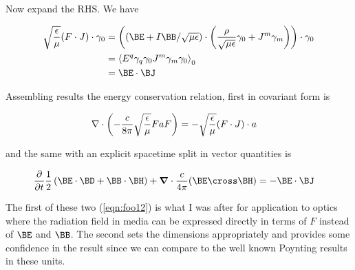 Now expand the RHS.  We have

\begin{align*}
\sqrt{\frac{\epsilon}{\mu}}
(F \cdot J) \cdot \gamma_0
&=
\left((\BE + I \BB/\sqrt{\mu\epsilon}) \cdot \left( \frac{\rho}{\sqrt{\mu\epsilon}} \gamma_0 + J^m \gamma_m \right) \right) \cdot \gamma_0  \\
&=
\gpgradezero{E^q \gamma_q \gamma_0 J^m \gamma_m \gamma_0} \\
&=
\BE \cdot \BJ
\end{align*}

Assembling results the energy conservation relation, first in covariant form is

\begin{align}\label{eqn:foo12}
\nabla \cdot \left( -\frac{c}{8 \pi} \sqrt{\frac{\epsilon}{\mu}} F a F \right) &= - \sqrt{\frac{\epsilon}{\mu}}(F \cdot J) \cdot a
\end{align}

and the same with an explicit spacetime split in vector quantities is

\begin{align}\label{eqn:foo13}
\frac{\partial}{\partial t} \frac{1}{2} \left(\BE \cdot \BD + \BB \cdot \BH \right) + \spacegrad \cdot \frac{c}{4\pi}(\BE \cross \BH)
&=
-\BE \cdot \BJ
\end{align}

The first of these two (\ref{eqn:foo12}) is what I was after for application to optics where the radiation field in media can be expressed directly in terms of $F$ instead of $\BE$ and $\BB$.  The second sets the dimensions appropriately and provides some confidence in the result since we can compare to the well known Poynting results in these units.

%

\EndArticle
